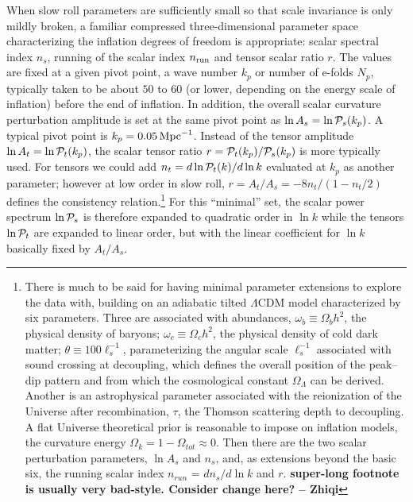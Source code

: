 \documentclass[a4paper,11pt]{article}
\def\mpc{{\rm\,Mpc}}
\def\mpc{{\rm\,Mpc}}
\newcommand{\zq}[1]{{\color{red} \bf{ #1} -- Zhiqi}}
\begin{document}
When slow roll parameters are sufficiently small so that scale
invariance is only mildly broken, a familiar compressed
three-dimensional parameter space characterizing the inflation degrees
of freedom is appropriate: scalar spectral index $n_s$, running of the
scalar index $n_{\rm run}$ and tensor scalar ratio $r$. The values are
fixed at a given pivot point, a wave number $k_p$ or number of e-folds
$N_p$, typically taken to be about $50$ to $60$ (or lower, depending
on the energy scale of inflation) before the end of inflation. In
addition, the overall scalar curvature perturbation amplitude is set
at the same pivot point as $\ln A_s = \ln {\cal P}_{s} (k_p)$. A
typical pivot point is $k_p=0.05 \mpc^{-1}$. Instead of the tensor
amplitude $\ln A_t = \ln {\cal P}_{t} (k_p)$, the scalar tensor ratio
$r ={\cal P}_{t} (k_p)/{\cal P}_{s} (k_p)$ is more typically used. For
tensors we could add $n_t = d\ln {\cal P}_{t} (k)/d\ln k$ evaluated at
$k_p$ as another parameter; however at low order in slow roll,
$r=A_t/A_s = -8 n_t /(1-n_t/2)$ defines the consistency
relation.\footnote{There is much to be said for having minimal
  parameter extensions to explore the data with, building on an
  adiabatic tilted $\Lambda$CDM model characterized by six
  parameters. Three are associated with abundances,
  $\omega_b\equiv\Omega_bh^2$, the physical density of baryons;
  $\omega_c\equiv\Omega_ch^2$, the physical density of cold dark
  matter; $\theta\equiv100\ell_s^{-1}$, parameterizing the angular
  scale $\ell_s^{-1}$ associated with sound crossing at decoupling,
  which defines the overall position of the peak--dip pattern and from
  which the cosmological constant $\Omega_\Lambda$ can be
  derived. Another is an astrophysical parameter associated with the
  reionization of the Universe after recombination, $\tau$, the
  Thomson scattering depth to decoupling. A flat Universe theoretical
  prior is reasonable to impose on inflation models, the curvature
  energy $\Omega_k = 1-\Omega_{tot} \approx 0$. Then there are the two
  scalar perturbation parameters, $\ln A_s$ and $n_s$, and, as
  extensions beyond the basic six, the running scalar index $n_{run}$
  = $d n_s / d \ln k$ and $r$. \zq{super-long footnote is usually very bad-style. Consider change here?}}  For this ``minimal'' set, the scalar
power spectrum $\ln {\cal P}_s$ is therefore expanded to quadratic
order in $\ln k$ while the tensors $\ln {\cal P}_t $ are expanded to
linear order, but with the linear coefficient for $\ln k$ basically
fixed by $A_t/ A_s$.
\end{document}
